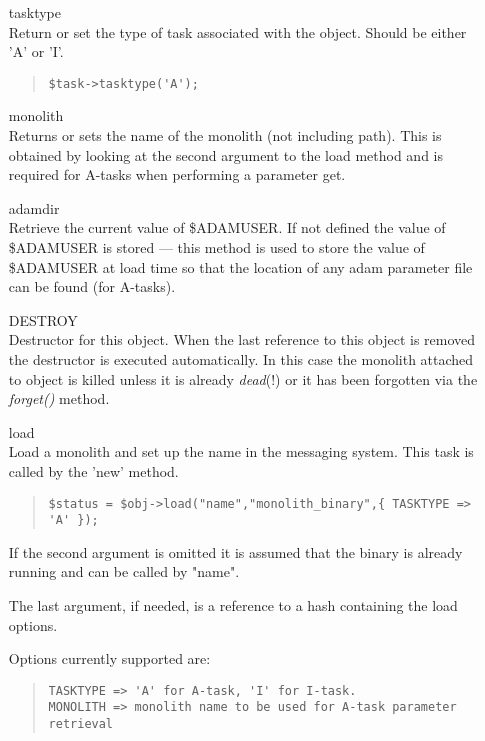 \documentclass[twoside,11pt]{article}
\newenvironment{myquote}{\begin{quote}\begin{small}}{\end{small}\end{quote}}
\renewcommand{\_}{\texttt{\symbol{95}}}
\begin{document}
\begin{itemize}
\item[tasktype]%
%
\hfil\\
Return or set the type of task associated with the object.
Should be either 'A' or 'I'.
\begin{myquote}
\begin{verbatim}
$task->tasktype('A');
\end{verbatim}
\end{myquote}

\item[monolith]%
%
\hfil\\
Returns or sets the name of the monolith (not including path).
This is obtained by looking at the second argument to the
load method and is required for A-tasks when performing a parameter
get.

\item[adamdir]%
%
\hfil\\
Retrieve the current value of \$ADAM\_{}USER. If not defined the
value of \$ADAM\_{}USER is stored --- this method is used to store the
value of \$ADAM\_{}USER at load time so that the location of any
adam parameter file can be found (for A-tasks).

\item[DESTROY]%
%
\hfil\\
Destructor for this object. When the last reference to this
object is removed the destructor is executed automatically.
In this case the monolith attached to object is killed 
unless it is already {\em dead\/}(!) or it has been forgotten
via the {\em forget()\/} method.

\item[load]%
%
\hfil\\
Load a monolith and set up the name in the messaging system.
This task is called by the 'new' method.
\begin{myquote}
\begin{verbatim}
$status = $obj->load("name","monolith_binary",{ TASKTYPE => 'A' });
\end{verbatim}
\end{myquote}

If the second argument is omitted it is assumed that the binary
is already running and can be called by "name".   

The last argument, if needed, is a reference to a hash containing
the load options. 

Options currently supported are:
\begin{myquote}
\begin{verbatim}
TASKTYPE => 'A' for A-task, 'I' for I-task.
MONOLITH => monolith name to be used for A-task parameter retrieval
\end{verbatim}
\end{myquote}


\end{itemize}
\end{document}
